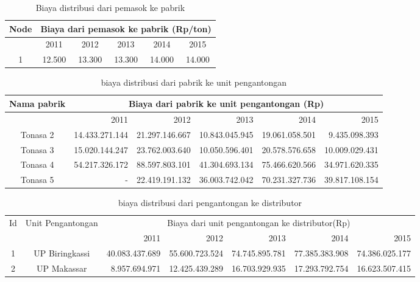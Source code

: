 \documentclass{article}
\begin{document}
\begin{table}[h]
	\caption{Biaya distribusi dari pemasok ke pabrik}
	\begin{tabular}{|c|c|c|c|c|c|}
		\hline
		\multicolumn{ 1}{|c|}{Node} &   \multicolumn{ 5}{|c|}{Biaya dari pemasok ke pabrik (Rp/ton)} \\
		\hline
		\multicolumn{ 1}{|c|}{} &       2011 &       2012 &       2013 &       2014 &       2015 \\
		\hline
		1 &     12.500 &     13.300 &     13.300 &     14.000 &     14.000 \\
		\hline
	\end{tabular}  

\end{table}
\begin{table}[h]
	\caption{biaya distribusi dari pabrik ke unit pengantongan}
	\begin{tabular}{|c|r|r|r|r|r|}
		\hline
		\multicolumn{ 1}{|c|}{Nama pabrik} & \multicolumn{ 5}{|c|}{Biaya dari pabrik ke unit pengantongan (Rp)} \\
		\hline
		\multicolumn{ 1}{|c|}{} &       2011 &       2012 &       2013 &       2014 &       2015 \\
		\hline
		Tonasa 2 & 14.433.271.144 & 21.297.146.667 & 10.843.045.945 & 19.061.058.501 & 9.435.098.393 \\
		\hline
		Tonasa 3 & 15.020.144.247 & 23.762.003.640 & 10.050.596.401 & 20.578.576.658 & 10.009.029.431 \\
		\hline
		Tonasa 4 & 54.217.326.172 & 88.597.803.101 & 41.304.693.134 & 75.466.620.566 & 34.971.620.335 \\
		\hline
		Tonasa 5 &          - & 22.419.191.132 & 36.003.742.042 & 70.231.327.736 & 39.817.108.154 \\
		\hline
	\end{tabular}  	
\end{table}
\begin{table}
	\caption{biaya distribusi dari pengantongan ke distributor}
	\begin{tabular}{|c|c|rrrrr|}
		\hline
		\multicolumn{ 1}{|c|}{Id} & \multicolumn{ 1}{|c|}{Unit Pengantongan} & \multicolumn{ 5}{|c}{Biaya dari unit pengantongan ke distributor(Rp)} \\
		
		\multicolumn{ 1}{|c|}{} & \multicolumn{ 1}{|c|}{} &       2011 &       2012 &       2013 &       2014 &       2015 \\
		\hline
		1 & UP Biringkassi & 40.083.437.689 & 55.600.723.524 & 74.745.895.781 & 77.385.383.908 & 74.386.025.177 \\
		\hline
		2 & UP Makassar & 8.957.694.971 & 12.425.439.289 & 16.703.929.935 & 17.293.792.754 & 16.623.507.415 \\
		\hline
	\end{tabular}  
\end{table}
\end{document}
